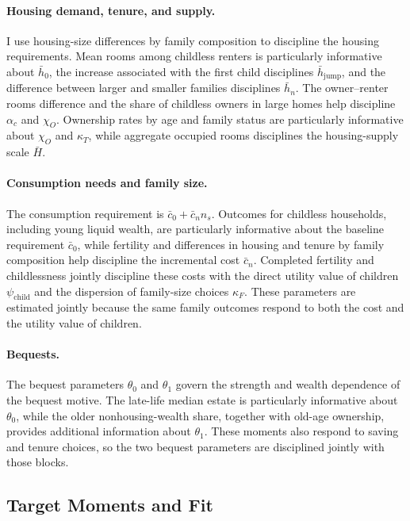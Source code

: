 \documentclass[11pt]{article}
\theoremstyle{definition}
\newcommand{\1}{\mathbf 1}
\begin{document}
\paragraph{Housing demand, tenure, and supply.}
I use housing-size differences by family composition to discipline the housing
requirements. Mean rooms among childless renters is particularly informative
about $\bar h_0$, the increase associated with the first child disciplines
$\bar h_{\mathrm{jump}}$, and the difference between larger and smaller
families disciplines $\bar h_n$. The owner--renter rooms difference and the
share of childless owners in large homes help discipline $\alpha_c$ and
$\chi_O$. Ownership rates by age and family status are particularly informative
about $\chi_O$ and $\kappa_T$, while aggregate occupied rooms disciplines the
housing-supply scale $\bar H$.

\paragraph{Consumption needs and family size.}
The consumption requirement is $\bar c_0+\bar c_n n_s$. Outcomes for childless
households, including young liquid wealth, are particularly informative about
the baseline requirement $\bar c_0$, while fertility and differences in housing
and tenure by family composition help discipline the incremental cost
$\bar c_n$. Completed fertility and childlessness jointly discipline these
costs with the direct utility value of children $\psi_{\mathrm{child}}$ and the
dispersion of family-size choices $\kappa_F$. These parameters are estimated
jointly because the same family outcomes respond to both the cost and the
utility value of children.

\paragraph{Bequests.}
The bequest parameters $\theta_0$ and $\theta_1$ govern the strength and wealth
dependence of the bequest motive. The late-life median estate is particularly
informative about $\theta_0$, while the older nonhousing-wealth share, together
with old-age ownership, provides additional information about $\theta_1$.
These moments also respond to saving and tenure choices, so the two bequest
parameters are disciplined jointly with those blocks.

\subsection{Target Moments and Fit}
\end{document}
